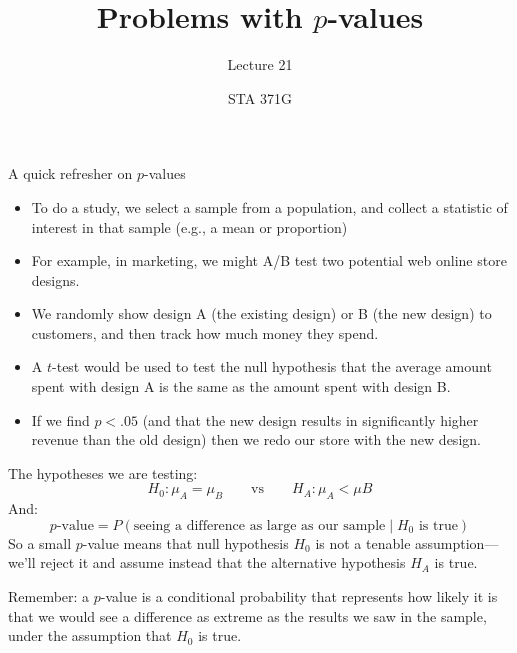 \documentclass{beamer}\usepackage[]{graphicx}\usepackage[]{color}
\title{Problems with $p$-values}
\subtitle{Lecture 21}
\author{STA 371G}
\begin{document}
  
  

  \frame{\maketitle}



  \begin{darkframes}
    \begin{frame}{A quick refresher on $p$-values}
      \begin{itemize}[<+->]
        \item To do a study, we select a sample from a population, and collect a statistic of interest in that sample (e.g., a mean or proportion)
        \item For example, in marketing, we might A/B test two potential web online store designs.
        \item We randomly show design A (the existing design) or B (the new design) to customers, and then track how much money they spend.
        \item A $t$-test would be used to test the null hypothesis that the average amount spent with design A is the same as the amount spent with design B.
        \item If we find $p<.05$ (and that the new design results in significantly higher revenue than the old design) then we redo our store with the new design.
      \end{itemize}
    \end{frame}

    \begin{frame}
      The hypotheses we are testing:
      \[
        H_0 : \mu_A=\mu_B \qquad\text{vs}\qquad
        H_A : \mu_A<\mu B
      \]
      And:
      \[
        \text{$p$-value} = P(\text{seeing a difference as large as our sample} \mid \text{$H_0$ is true})
      \]
      \pause
      So a small $p$-value means that null hypothesis $H_0$ is not a tenable assumption---we'll reject it and assume instead that the alternative hypothesis $H_A$ is true.
    \end{frame}

    \begin{frame}
      Remember: a $p$-value is a \alert{conditional probability} that represents how likely it is that we would see a difference as extreme as the results we saw in the sample, under the assumption that $H_0$ is true.


\end{frame}
\end{darkframes}
\end{document}

